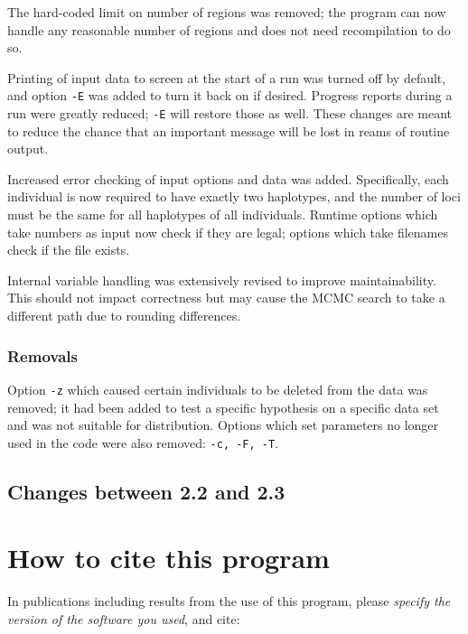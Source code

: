 \documentclass[10pt,titlepage,times,letterpaper]{article}
\begin{document}
The hard-coded limit on number of regions was removed; the program can
now handle any reasonable number of regions and does not need
recompilation to do so.

Printing of input data to screen at the start of a run was turned off
by default, and option {\tt -E} was added to turn it back on if desired.
Progress reports during a run were greatly reduced; {\tt -E} will
restore those as well.  These changes are
meant to reduce the chance that an important message will be
lost in reams of routine output.

Increased error checking of input options and data was added.  Specifically,
each individual is now required to have exactly two haplotypes, and the
number of loci must be the same for all haplotypes of all individuals.
Runtime options which take numbers as input now check if they are legal;
options which take filenames check if the file exists.

Internal variable handling was extensively revised to improve maintainability.
This should not impact correctness but may cause the MCMC search to take a
different path due to rounding differences.

\subsubsection{Removals}
Option {\tt -z} which caused certain individuals to be deleted
from the data was removed; it had been added to test a specific hypothesis
on a specific data set and was not suitable for distribution.
Options which set parameters no longer used in the code were
also removed:  {\tt -c, -F, -T}.


\subsection{Changes between 2.2 and 2.3}



\section{How to cite this program}

In publications including results from the use of this program, please
{\it specify the version of the software you used}, and cite:
\end{document}
